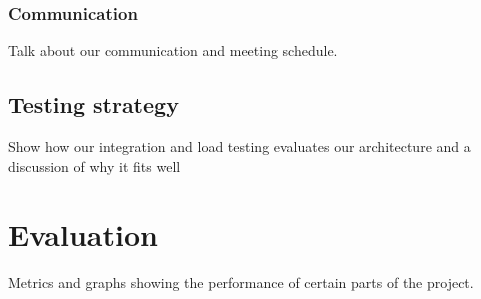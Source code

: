 \documentclass[prodmode,acmtosem]{acmsmall} %
\begin{document}
\subsubsection{Communication}
Talk about our communication and meeting schedule.

\subsection{Testing strategy}
Show how our integration and load testing evaluates our architecture and a discussion of why it fits well

\section{Evaluation}
Metrics and graphs showing the performance of certain parts of the project.
\end{document}
